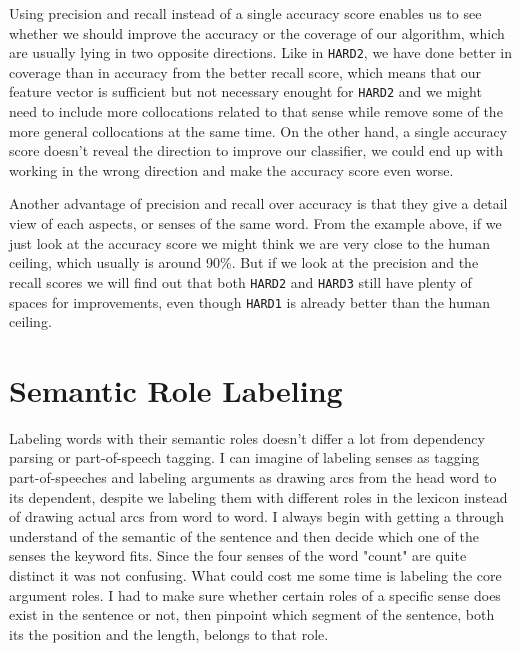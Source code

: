 \documentclass[11pt]{article} %
\begin{document}
Using precision and recall instead of a single accuracy score enables us to see whether we should improve the accuracy or the coverage of our algorithm, which are usually lying in two opposite directions. Like in \texttt{HARD2}, we have done better in coverage than in accuracy from the better recall score, which means that our feature vector is sufficient but not necessary enought for \texttt{HARD2} and we might need to include more collocations related to that sense while remove some of the more general collocations at the same time. On the other hand, a single accuracy score doesn't reveal the direction to improve our classifier, we could end up with working in the wrong direction and make the accuracy score even worse.

Another advantage of precision and recall over accuracy is that they give a detail view of each aspects, or senses of the same word. From the example above, if we just look at the accuracy score we might think we are very close to the human ceiling, which usually is around 90\%. But if we look at the precision and the recall scores we will find out that both \texttt{HARD2} and 
\texttt{HARD3} still have plenty of spaces for improvements, even though \texttt{HARD1} is already better than the human ceiling.

\section{Semantic Role Labeling}

Labeling words with their semantic roles doesn't differ a lot from dependency parsing or part-of-speech tagging. I can imagine of labeling senses as tagging part-of-speeches and labeling arguments as drawing arcs from the head word to its dependent, despite we labeling them with different roles in the lexicon instead of drawing actual arcs from word to word. I always begin with getting a through understand of the semantic of the sentence and then decide which one of the senses the keyword fits. Since the four senses of the word "count" are quite distinct it was not confusing. What could cost me some time is labeling the core argument roles. I had to make sure whether certain roles of a specific sense does exist in the sentence or not, then pinpoint which segment of the sentence, both its the position and the length, belongs to that role.
\end{document}
